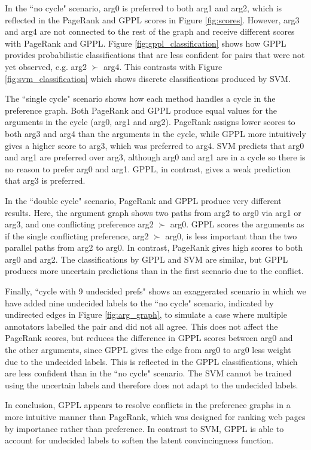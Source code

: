 In the  ``no cycle" scenario, 
arg0 is preferred to both arg1 and arg2, which is reflected in the PageRank and GPPL scores in Figure \ref{fig:scores}. However, arg3 and arg4 are not connected to the rest of the graph and receive different scores with PageRank and GPPL. 
Figure \ref{fig:gppl_classification} shows how GPPL provides probabilistic classifications that are less confident for pairs that were not yet observed, e.g. arg2 $\succ$ arg4. This contrasts with Figure \ref{fig:svm_classification} which shows discrete classifications produced by SVM.

The ``single cycle" scenario shows how each method handles a cycle in the preference graph.
Both PageRank and GPPL produce equal values for the arguments in the cycle (arg0, arg1 and arg2). PageRank assigns lower scores to both arg3 and arg4 than the arguments in the cycle, 
while GPPL more intuitively gives a higher score to arg3, which was preferred to arg4. 
SVM predicts that arg0 and arg1 are preferred over arg3, 
although arg0 and arg1 are in a cycle so there is no reason to prefer arg0 and arg1. 
GPPL, in contrast, gives a weak prediction that arg3 is preferred.

In the ``double cycle" scenario, PageRank and GPPL produce very different results.
Here, the argument graph shows two paths from arg2 to arg0 via arg1 or arg3, and one conflicting
preference arg2 $\succ$ arg0. 
GPPL scores the arguments as if the single conflicting preference, arg2 $\succ$ arg0, 
is less important than the two parallel paths from arg2 to arg0. 
In contrast, PageRank gives high scores to both arg0 and arg2.
The classifications by GPPL and SVM are similar, but GPPL produces more uncertain 
predictions than in the first scenario due to the conflict.

Finally, ``cycle with 9 undecided prefs" shows an exaggerated scenario in which
we have added nine undecided labels to the ``no cycle" scenario, indicated by 
undirected edges in Figure \ref{fig:arg_graph}, to simulate a case where multiple annotators labelled the pair 
and did not all agree. 
This does not affect the PageRank scores, 
but reduces the difference in GPPL scores between arg0 and the other arguments, 
since GPPL gives the edge from arg0 to arg0 less weight due to the undecided labels. 
This is reflected in the GPPL classifications, which are less confident than in the ``no cycle" scenario.
The SVM cannot be trained using the uncertain labels and therefore does not adapt to the undecided labels. 

In conclusion, GPPL appears to resolve conflicts in the preference graphs in a
more intuitive manner than PageRank, which was designed for ranking web pages by 
importance rather than preference. 
In contrast to SVM, GPPL is able to account for undecided labels to soften the latent convincingness function.

